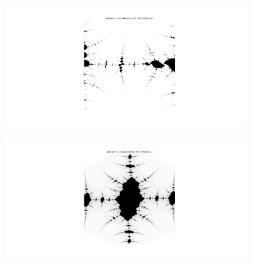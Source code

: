 \documentclass{article}
\begin{document}
\begin{figure}[h!]
  \centering
  \begin{subfigure}[b]{1\linewidth}
    \includegraphics[width=\linewidth]{Fractal_image/3sin(z)+c_-07444+01131.png}
  \end{subfigure}
  \begin{subfigure}[b]{1\linewidth}
    \includegraphics[width=\linewidth]{Fractal_image/3cos(z)+c_-0444+-01131.png}
  \end{subfigure}
\end{figure}




\newpage


\printbibliography[title = {References}]
\end{document}
